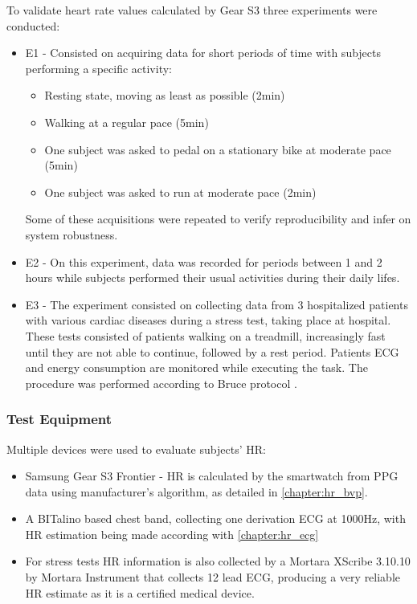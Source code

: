 To validate heart rate values calculated by Gear S3 three experiments were conducted:
\begin{itemize}
	\item E1 - Consisted on acquiring data for short periods of time with subjects performing a specific activity:
	\begin{itemize}
		\item Resting state, moving as least as possible (2min)
		\item Walking at a regular pace (5min)
		\item One subject was asked to pedal on a  stationary bike  at moderate pace (5min)
		\item One subject was asked to run at moderate pace (2min)
	\end{itemize}
	Some of these acquisitions were repeated to verify reproducibility and infer on system robustness.
	\item E2 - On this experiment, data was recorded for periods between 1 and 2 hours while subjects performed their usual activities during their daily lifes.
	\item E3 - The experiment consisted on collecting data from 3 hospitalized patients with various cardiac diseases during a stress test, taking place at hospital.
	These tests consisted of patients walking on a treadmill, increasingly fast until they are not able to continue, followed by a rest period. Patients ECG and energy consumption are monitored while executing the task. The procedure was performed according to Bruce protocol \cite{bruce}.
\end{itemize}


\subsubsection{Test Equipment}

Multiple devices were used to evaluate subjects' HR:

\begin{itemize}
	
	\item Samsung Gear S3 Frontier - HR is calculated by the smartwatch from PPG data using manufacturer's algorithm, as detailed in \cref{chapter:hr_bvp}.
	\item A BITalino based chest band, collecting one derivation ECG at 1000Hz, with HR estimation being made according with \cref{chapter:hr_ecg}
	\item For stress tests HR information is also collected by a Mortara XScribe 3.10.10 by Mortara Instrument \cite{mortara} that collects 12 lead ECG, producing a very reliable HR estimate as it is a certified medical device.	
	
\end{itemize}

